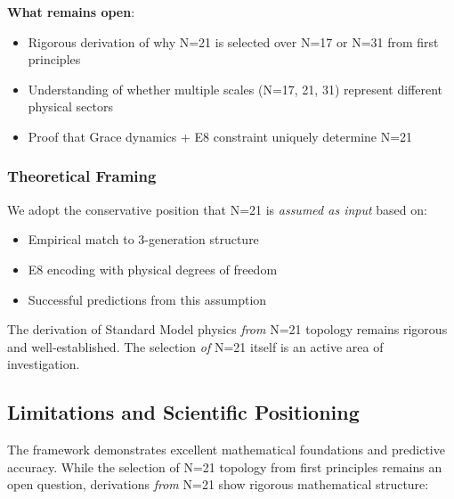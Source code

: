 \documentclass[12pt,a4paper]{article}
\begin{document}
\textbf{What remains open}:
\begin{itemize}
\item Rigorous derivation of why N=21 is selected over N=17 or N=31 from first principles
\item Understanding of whether multiple scales (N=17, 21, 31) represent different physical sectors
\item Proof that Grace dynamics + E8 constraint uniquely determine N=21
\end{itemize}

\subsubsection{Theoretical Framing}
We adopt the conservative position that N=21 is \textit{assumed as input} based on:
\begin{itemize}
\item Empirical match to 3-generation structure
\item E8 encoding with physical degrees of freedom
\item Successful predictions from this assumption
\end{itemize}

The derivation of Standard Model physics \textit{from} N=21 topology remains rigorous and well-established. The selection \textit{of} N=21 itself is an active area of investigation.

\subsection{Limitations and Scientific Positioning}

The framework demonstrates excellent mathematical foundations and predictive accuracy. While the selection of N=21 topology from first principles remains an open question, derivations \textit{from} N=21 show rigorous mathematical structure:
\end{document}

